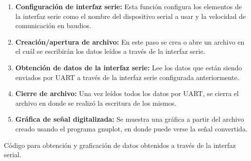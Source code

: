 \begin{enumerate}
	\item \textbf{Configuración de interfaz serie:} Esta función configura los elementos de la interfaz serie como el nombre del dispositivo serial a usar y la velocidad de comunicación en baudios.
	\item \textbf{Creación/apertura de archivo:} En este paso se crea o abre un archivo en el cuál se escribirán los datos leídos a través de la interfaz serie.
	\item \textbf{Obtención de datos de la interfaz serie:} Lee los datos que están siendo enviados por UART a través de la interfaz serie configurada anteriormente.
	\item \textbf{Cierre de archivo:} Una vez leídos todos los datos por UART, se cierra el archivo en donde se realizó la escritura de los mismos.
	\item \textbf{Gráfica de señal digitalizada:} Se muestra una gráfica a partir del archivo creado usando el programa gnuplot, en donde puede verse la señal convertida.
\end{enumerate}
\pagebreak
\lstset{language=c}
Código para obtención y graficación de datos obtenidos a través de la interfaz serial.
